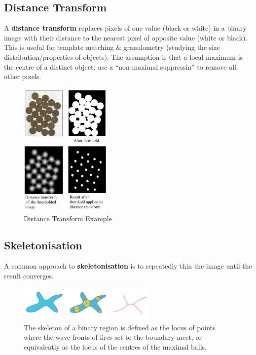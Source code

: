 \documentclass[a4paper,11pt]{article}
\begin{document}
\subsection{Distance Transform}
A \textbf{distance transform} replaces pixels of one value (black or white) in a binary image with their distance to the nearest pixel of opposite value (white or black).
This is useful for template matching \& granulometry (studying the size distribution/properties of objects).
The assumption is that a local maximum is the centre of a distinct object: use a ``non-maximal suppressin'' to remove all other pixels.

\begin{figure}[H]
    \centering
    \includegraphics[width=0.4\textwidth]{images/distancetransform.png}
    \caption{Distance Transform Example}
\end{figure}

\subsection{Skeletonisation}
A common approach to \textbf{skeletonisation} is to repeatedly thin the image until the result converges.
\begin{figure}[H]
    \centering
    \includegraphics[width=0.6\textwidth]{images/skeletonisation.png}
    \caption{The skeleton of a binary region is defined as the locus of points where the wave fronts of fires set to the boundary meet, or equivalently as the locus of the centres of the maximal balls.}
\end{figure}
\end{document}
